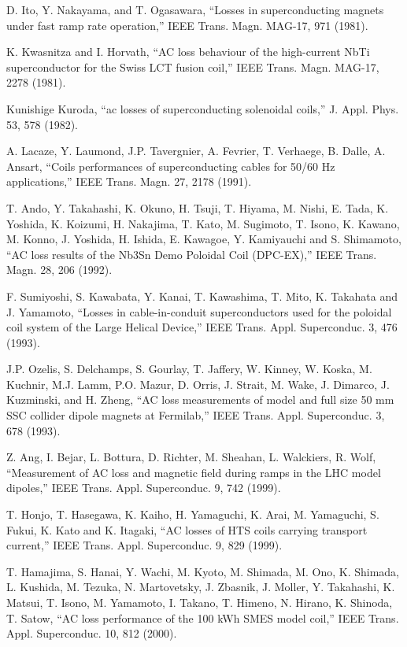 \noindent [7.66] D. Ito, Y. Nakayama, and T. Ogasawara, ``Losses in superconducting magnets under fast ramp rate operation,” IEEE Trans. Magn. MAG-17, 971 (1981).

\noindent [7.67] K. Kwasnitza and I. Horvath, ``AC loss behaviour of the high-current NbTi superconductor for the Swiss LCT fusion coil,” 
IEEE Trans. Magn. MAG-17, 2278 (1981).

\noindent [7.68] Kunishige Kuroda, ``ac losses of superconducting solenoidal coils,” J. Appl. Phys. 53, 578 (1982).

\noindent [7.69] A. Lacaze, Y. Laumond, J.P. Tavergnier, A. Fevrier, T. Verhaege, B. Dalle, A.
Ansart, ``Coils performances of superconducting cables for 50/60 Hz applications,”
IEEE Trans. Magn. 27, 2178 (1991).

\noindent [7.70] T. Ando, Y. Takahashi, K. Okuno, H. Tsuji, T. Hiyama, M. Nishi, E. Tada, K.
Yoshida, K. Koizumi, H. Nakajima, T. Kato, M. Sugimoto, T. Isono, K. Kawano,
M. Konno, J. Yoshida, H. Ishida, E. Kawagoe, Y. Kamiyauchi and S. Shimamoto,
``AC loss results of the Nb3Sn Demo Poloidal Coil (DPC-EX),” IEEE Trans. Magn.
28, 206 (1992).

\noindent [7.71] F. Sumiyoshi, S. Kawabata, Y. Kanai, T. Kawashima, T. Mito, K. Takahata and
J. Yamamoto, ``Losses in cable-in-conduit superconductors used for the poloidal
coil system of the Large Helical Device,” IEEE Trans. Appl. Superconduc. 3, 476
(1993).

\noindent [7.72] J.P. Ozelis, S. Delchamps, S. Gourlay, T. Jaffery, W. Kinney, W. Koska, M. Kuchnir,
M.J. Lamm, P.O. Mazur, D. Orris, J. Strait, M. Wake, J. Dimarco, J. Kuzminski,
and H. Zheng, ``AC loss measurements of model and full size 50 mm SSC collider
dipole magnets at Fermilab,” IEEE Trans. Appl. Superconduc. 3, 678 (1993).

\noindent [7.73] Z. Ang, I. Bejar, L. Bottura, D. Richter, M. Sheahan, L. Walckiers, R. Wolf,
 ``Measurement of AC loss and magnetic field during ramps in the LHC model dipoles,” IEEE Trans. Appl. Superconduc. 9, 742 (1999).

\noindent [7.74] T. Honjo, T. Hasegawa, K. Kaiho, H. Yamaguchi, K. Arai, M. Yamaguchi, S. Fukui, K. Kato and K. Itagaki, ``AC losses of HTS coils carrying transport current,” 
IEEE Trans. Appl. Superconduc. 9, 829 (1999).

\noindent [7.75] T. Hamajima, S. Hanai, Y. Wachi, M. Kyoto, M. Shimada, M. Ono, K. Shimada, L. Kushida, M. Tezuka, N. Martovetsky, J. Zbasnik, J. Moller, Y. Takahashi,
K. Matsui, T. Isono, M. Yamamoto, I. Takano, T. Himeno, N. Hirano, K. Shinoda,
T. Satow, ``AC loss performance of the 100 kWh SMES model coil,” IEEE Trans.
Appl. Superconduc. 10, 812 (2000).

